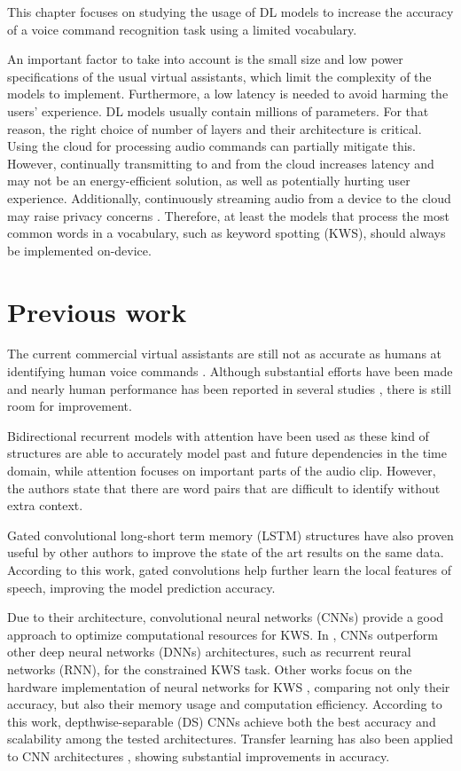 This chapter focuses on studying the usage of DL models to increase the accuracy of a voice command recognition task using a limited vocabulary.

An important factor to take into account is the small size and low power specifications of the usual virtual assistants, which limit the complexity of the models to implement. Furthermore, a low latency is needed to avoid harming the users' experience. DL models usually contain millions of parameters. For that reason, the right choice of number of layers and their architecture is critical. Using the cloud for processing audio commands can partially mitigate this. However, continually transmitting to and from the cloud increases latency and may not be an energy-efficient solution, as well as potentially hurting user experience. Additionally, continuously streaming audio from a device to the cloud may raise privacy concerns \autocite{iqabal2022}. Therefore, at least the models that process the most common words in a vocabulary, such as keyword spotting (KWS), should always be implemented on-device.

\section{Previous work}
The current commercial virtual assistants are still not as accurate as humans at identifying human voice commands \autocite{Michaely2017}. Although substantial efforts have been made and nearly human performance has been reported in several studies \autocite{Andrade2018, Zhang2017, Mcmahan2017, Warden2018}, there is still room for improvement. 

Bidirectional recurrent models with attention have been used \autocite{Andrade2018} as these kind of structures are able to accurately model past and future dependencies in the time domain, while attention focuses on important parts of the audio clip. However, the authors state that there are word pairs that are difficult to identify without extra context.

Gated convolutional long-short term memory (LSTM) structures have also proven useful by other authors \autocite{Wang2018} to improve the state of the art results on the same data. According to this work, gated convolutions help further learn the local features of speech, improving the model prediction accuracy.

Due to their architecture, convolutional neural networks (CNNs) provide a good approach to optimize computational resources for KWS. In \autocite{Tara2015}, CNNs outperform other deep neural networks (DNNs) architectures, such as recurrent reural networks (RNN), for the constrained KWS task. Other works focus on the hardware implementation of neural networks for KWS \autocite{Zhang2017}, comparing not only their accuracy, but also their memory usage and computation efficiency. According to this work, depthwise-separable (DS) CNNs achieve both the best accuracy and scalability among the tested architectures.  Transfer learning has also been applied to CNN architectures \autocite{Mcmahan2017}, showing substantial improvements in accuracy.

